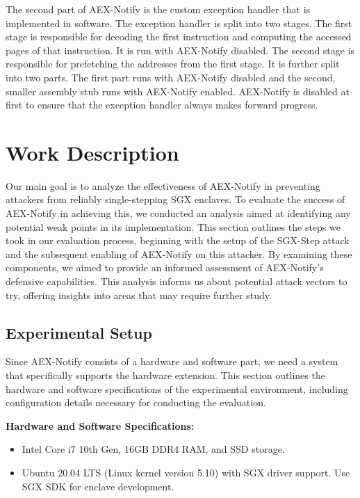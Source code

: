 \documentclass{llncs}
\begin{document}
The second part of AEX-Notify is the custom exception handler that is implemented in software.
The exception handler is split into two stages.
The first stage is responsible for decoding the first instruction and
computing the accessed pages of that instruction.
It is run with AEX-Notify disabled.
The second stage is responsible for prefetching the addresses from the first stage.
It is further split into two parts.
The first part runs with AEX-Notify disabled
and the second, smaller assembly stub runs with AEX-Notify enabled.
AEX-Notify is disabled at first to ensure that the exception handler always makes forward progress.

\section{Work Description}

Our main goal is to analyze the effectiveness of AEX-Notify
in preventing attackers from reliably single-stepping SGX enclaves.
To evaluate the success of AEX-Notify in achieving this,
we conducted an analysis aimed at identifying any potential weak points in its implementation.
This section outlines the steps we took in our evaluation process,
beginning with the setup of the SGX-Step attack and the subsequent enabling of AEX-Notify on this attacker.
By examining these components,
we aimed to provide an informed assessment of AEX-Notify’s defensive capabilities.
This analysis informs us about potential attack vectors to try,
offering insights into areas that may require further study.

\subsection{Experimental Setup}

Since AEX-Notify consists of a hardware and software part,
we need a system that specifically supports the hardware extension.
This section outlines the hardware and software specifications of the experimental environment,
including configuration details necessary for conducting the evaluation.

\textbf{Hardware and Software Specifications:}
\begin{itemize}
  \item Intel Core i7 10th Gen, 16GB DDR4 RAM, and SSD storage.
  \item Ubuntu 20.04 LTS (Linux kernel version 5.10) with SGX driver support. Use SGX SDK for enclave development.
\end{itemize}
\end{document}
